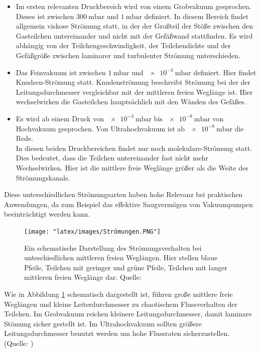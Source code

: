		\begin{itemize}
			\item
			Im ersten relevanten Druckbereich wird von einem Grobvakuum gesprochen. Dieses ist zwischen $\SI{300}{\milli\bar}$ und $\SI{1}{\milli\bar}$ definiert.
			In diesem Bereich findet allgemein viskose Strömung statt, in der der Großteil der Stöße zwischen den Gasteilchen untereinander und nicht mit der Gefäßwand stattfinden.
			Es wird abhängig von der Teilchengeschwindigkeit, der Teilchendichte und der Gefäßgröße zwischen laminarer und turbulenter Strömung unterschieden. 

			\item
			Das Feinvakuum ist zwischen $\SI{1}{\milli\bar}$ und $\SI{e-3}{\milli\bar}$ definiert. Hier findet Knudsen-Strömung statt.
			Knudenströmung beschreibt Strömung bei der der Leitungsdurchmesser vergleichbar mit der mittleren freien Weglänge ist.
			Hier wechselwirken die Gasteilchen hauptsächlich mit den Wänden des Gefäßes.

			\item
			Es wird ab einem Druck von $\SI{e-3}{\milli\bar}$ bis $\SI{e-8}{\milli\bar}$ von Hochvakuum gesprochen. Von Ultrahochvakuum ist ab $\SI{e-8}{\milli\bar}$ die Rede.	\\	
			In diesen beiden Druckbereichen findet nur noch molekulare-Strömung statt.\\
			Dies bedeutet, dass die Teilchen untereinander fast nicht mehr Wechselwirken. 
			Hier ist die mittlere freie Weglänge größer als die Weite des Strömungskanals.
		\end{itemize}
		Diese unterschiedlichen Strömungsarten haben hohe Relevanz bei praktischen Anwendungen, da zum Beispiel das effektive Saugvermögen von Vakuumpumpen beeinträchtigt werden kann.
		\begin{figure}
			\centering
			\texttt{[image: "latex/images/Strömungen.PNG"]}
			\caption{Ein schematische Darstellung des Strömungsverhalten bei unteschiedlichen mittleren freien Weglängen.
				 Hier stellen blaue Pfeile, Teilchen mit geringer und grüne Pfeile, Teilchen mit langer mittleren freien Weglänge dar. \protect Quelle: \cite{pfeiffer:pump}}
			\label{fig:stroe}
		\end{figure}  
		Wie in Abbildung \ref{fig:stroe} schematisch dargestellt ist, führen große mittlere freie Weglängen und kleine Leiterdurchmesser zu chaotischem Flussverhalten der Teilchen.
		Im Grobvakuum reichen kleinere Leitungsdurchmesser, damit laminare Stömung sicher gestellt ist.
		Im Ultrahochvakuum sollten größere Leitungsdurchmesser benutzt werden um hohe Flussraten sicherzustellen.\\
		(Quelle: \cite{pfeiffer:grund})

